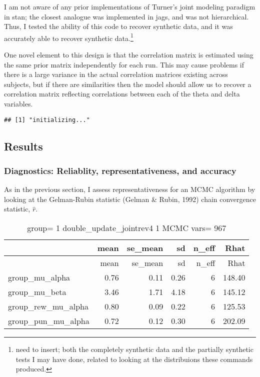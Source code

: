 \documentclass[]{article}
\let\rmarkdownfootnote\footnote%
\def\footnote{\protect\rmarkdownfootnote}
\begin{document}
I am not aware of any prior implementations of Turner's joint modeling
paradigm in stan; the closest analogue was implemented in jags, and was
not hierarchical. Thus, I tested the ability of this code to recover
synthetic data, and it was accurately able to recover synthetic
data.\footnote{need to insert; both the completely synthetic data and the partially synthetic tests I may have done, related to looking at the distribuions these commands produced.}

One novel element to this design is that the correlation matrix is
estimated using the same prior matrix independently for each run. This
may cause problems if there is a large variance in the actual
correlation matrices existing across subjects, but if there are
similarities then the model should allow us to recover a correlation
matrix reflecting correlations between each of the theta and delta
variables.

\begin{verbatim}
## [1] "initializing..."
\end{verbatim}

\subsection{Results}\label{results}

\subsubsection{Diagnostics: Reliablity, representativeness, and
accuracy}\label{diagnostics-reliablity-representativeness-and-accuracy}

As in the previous section, I assess representativeness for an MCMC
algorithm by looking at the Gelman-Rubin statistic (Gelman \& Rubin,
1992) chain convergence statistic, \(\widehat{r}\).

\begin{longtable}[]{@{}lrrrrr@{}}
\caption{group= 1 double\_update\_jointrev4 1 MCMC vars=
967}\tabularnewline
\toprule
& mean & se\_mean & sd & n\_eff & Rhat\tabularnewline
\midrule
\endfirsthead
\toprule
& mean & se\_mean & sd & n\_eff & Rhat\tabularnewline
\midrule
\endhead
group\_mu\_alpha & 0.76 & 0.11 & 0.26 & 6 & 148.40\tabularnewline
group\_mu\_beta & 3.46 & 1.71 & 4.18 & 6 & 145.12\tabularnewline
group\_rew\_mu\_alpha & 0.80 & 0.09 & 0.22 & 6 & 125.53\tabularnewline
group\_pun\_mu\_alpha & 0.72 & 0.12 & 0.30 & 6 & 202.09\tabularnewline
\bottomrule
\end{longtable}
\end{document}
